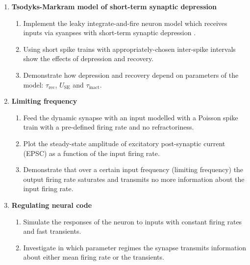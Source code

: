 \documentclass[12pt]{article}
\begin{document}
\begin{enumerate}
    \item \textbf{Tsodyks-Markram model of short-term synaptic
        depression}        

        \begin{enumerate}
            \item Implement the leaky integrate-and-fire neuron model
                which receives inputs via syanpses with short-term synaptic
                depression \citep{Tsodyks97}.
            \item Using short spike trains with appropriately-chosen inter-spike
                intervals show the effects of depression and recovery.
            \item Demonstrate how depression and recovery depend on
                parameters of the model: $\tau_{\mathrm{rec}}$,
                $U_{\mathrm{SE}}$ and $\tau_{\mathrm{inact}}$.
        \end{enumerate}

    \item \textbf{Limiting frequency}

        \begin{enumerate}
            \item Feed the dynamic synapse with an input modelled with
                a Poisson spike train with a pre-defined firing rate
                and no refractoriness.
            \item Plot the steady-state amplitude of excitatory post-synaptic
                current  (EPSC) as a function of the input firing
                rate.
            \item Demonstrate that over a certain input frequency
                (limiting frequency) the output firing rate saturates
                and transmits no more information about the input firing
                rate.
        \end{enumerate}

    \item \textbf{Regulating neural code}

        \begin{enumerate}
            \item Simulate the responses of the neuron to inputs with
            constant firing rates and fast transients.
        \item Investigate in which parameter regimes the synapse
            transmits information about either mean firing rate or  the
            transients.
        \end{enumerate}


\end{enumerate}
\end{document}
